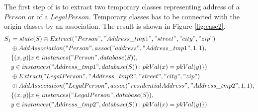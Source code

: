 \documentclass[11pt]{article}
\begin{document}
The first  step of is to extract two temporary classes representing address of a $Person$ or of a $LegalPerson$. Temporary classes has to be connected with the origin classes by an association. The result is shown in Figure \ref{fig:case2}.
\begin{align*}
S_1 &= state(S) \oplus Extract("Person", "Address\_tmp1", "street", "city", "zip") \\
& \oplus AddAssociation("Person", assoc("address", "Address\_tmp1", 1, 1),\\ 
& \{(x,y)| x \in instances("Person", database(S)), \\
& y \in instances("Address\_tmp1", database(S)) : pkVal(x) = pkVal(y) \}) \\
& \oplus Extract("LegalPerson", "Address\_tmp2", "street", "city", "zip")  \\
& \oplus AddAssociation("LegalPerson", assoc("residentialAddress", "Address\_tmp2", 1, 1),\\ 
& \{(x,y)| x \in instances("LegalPerson", database(S)), \\
& y \in instances("Address\_tmp2", database(S)) : pkVal(x) = pkVal(y) \}) \\
\end{align*}
\end{document}
